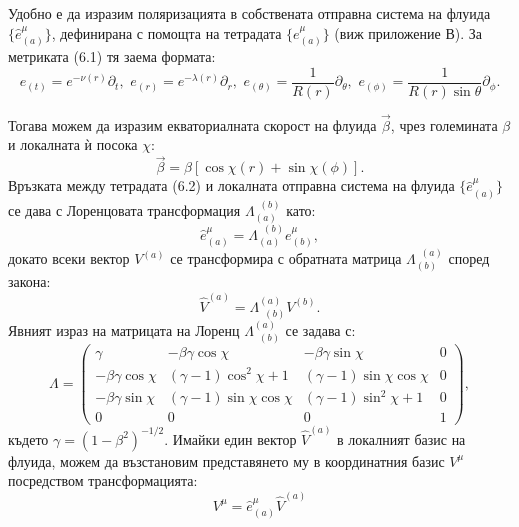 Удобно е да изразим поляризацията в собствената отправна система на флуида $\{\hat{e}^\mu_{(a)}\}$, дефинирана с помощта на тетрадата $\{e^\mu_{(a)}\}$ (виж приложение В). За метриката (6.1) тя заема формата:
\begin{equation}
	e_{(t)} = e^{-\nu(r)}\partial_t,\,\, e_{(r)} = e^{-\lambda(r)}\partial_r,\,\, e_{(\theta)} = \frac{1}{R(r)}\partial_{\theta},\,\, e_{(\phi)} = \frac{1}{R(r)\sin\theta}\partial_{\phi}.
\end{equation}

Тогава можем да изразим екваториалната скорост на флуида $\vec{\beta}$, чрез големината $\beta$ и локалната ѝ посока $\chi$:
\begin{equation}
	\vec{\beta} = \beta\left[\cos\chi (r) + \sin\chi (\phi)\right].
\end{equation}
Връзката между тетрадата (6.2) и локалната отправна система на флуида $\{\hat{e}^\mu_{(a)}\}$ се дава с Лоренцовата трансформация $\Lambda^{\,\,\,(b)}_{(a)}$ като:
\begin{equation}
	\hat{e}^\mu_{(a)} = \Lambda^{\,\,\,(b)}_{(a)}e^\mu_{(b)},
\end{equation}
докато всеки вектор $V^{(a)}$ се трансформира с обратната матрица $\Lambda^{\,\,\,(a)}_{(b)}$ според закона:
\begin{equation}
	\hat{V}^{(a)} = \Lambda^{(a)}_{\,\,\,(b)} V^{(b)}.
\end{equation}
Явният израз на матрицата на Лоренц $\Lambda^{(a)}_{\,\,\,(b)}$ се задава с:
\begin{equation}
	\Lambda = \begin{pmatrix}
			\gamma 			 & -\beta\gamma\cos\chi 	    & -\beta\gamma\sin\chi 		   & 0 \\
		-\beta\gamma\cos\chi & (\gamma - 1)\cos^2\chi + 1   & (\gamma - 1)\sin\chi\cos\chi & 0 \\
		-\beta\gamma\sin\chi & (\gamma - 1)\sin\chi\cos\chi & (\gamma - 1)\sin^2\chi + 1   & 0 \\
				0			 &					0			&				0			   & 1
	\end{pmatrix},
\end{equation}
където $\gamma = (1 - \beta^2)^{-1/2}$. Имайки един вектор $\hat{V}^{(a)}$ в локалният базис на флуида, можем да възстановим представянето му в координатния базис $V^\mu$ посредством трансформацията:
\begin{equation}
	V^\mu = \hat{e}^\mu_{(a)}\hat{V}^{(a)}
\end{equation}

